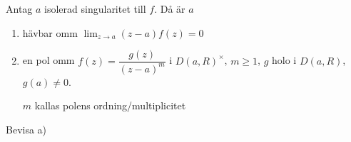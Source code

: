 \begin{theorem}
Antag $a$ isolerad singularitet till $f$. Då är $a$
\begin{enumerate}[label=\alph*)]
  \item hävbar omm $\lim_{z \to a} (z - a)f(z) = 0$
  \item en pol omm $f(z) = \dfrac{g(z)}{(z - a)^m}$ i $D(a, R)^\times$, $m \ge 1$, $g$ holo i $D(a, R)$, $g(a) \neq 0$.

  $m$ kallas polens ordning/multiplicitet
\end{enumerate}
\end{theorem}
\textcolor{magenta!80!black}{Bevisa a)}
